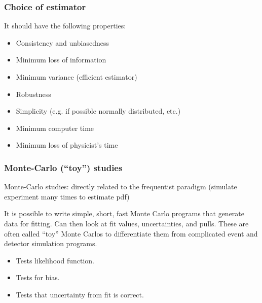 \documentclass[9pt]{beamer}
\begin{document}
\begin{frame}
 \frametitle{Choice of estimator}
  It should have the following properties:
 
 \begin{itemize}
  \item<2-> Consistency and unbiasedness
  \item<3-> Minimum loss of information
  \item<4-> Minimum variance (efficient estimator)
  \item<5-> Robustness
  \item<6-> Simplicity (e.g. if possible normally distributed, etc.)
  \item<7-> Minimum computer time
  \item<8-> Minimum loss of physicist's time
 \end{itemize}

\end{frame}

\begin{frame}
 \frametitle{Monte-Carlo (``toy'') studies}
 
 \begin{block}{}
  Monte-Carlo studies: directly related to the frequentist paradigm (simulate experiment many times to estimate pdf)
 \end{block}

 
It is possible to write simple, short, fast Monte Carlo programs
that generate data for fitting.   Can then look at fit values, 
uncertainties, and pulls.  These are often called “toy” Monte 
Carlos to differentiate them from complicated event and detector
simulation programs.

\begin{itemize}
 \item Tests likelihood function.
 \item Tests for bias.
 \item Tests that uncertainty from fit is correct.
\end{itemize}

\end{frame}
\end{document}
